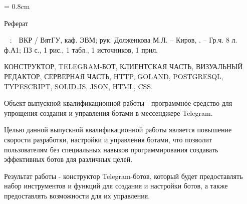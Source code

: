 
{

\topskip = 0.8cm
\begin{center}
	Реферат
\end{center}

\vspace{1em}

\authori\
\topic
:\
\mbox{\tpga}\
ВКР / ВятГУ, каф. ЭВМ; рук.
Долженкова М.Л. – Киров, \the\year. –
Гр.ч. 8 л. ф.А1;
ПЗ \pageref{lastpage} с.,
1 рис.,
1 табл.,
1 источников,
1 прил.

\vspace{1.5em}

КОНСТРУКТОР,
TELEGRAM-БОТ,
КЛИЕНТСКАЯ ЧАСТЬ,
ВИЗУАЛЬНЫЙ РЕДАКТОР,
СЕРВЕРНАЯ ЧАСТЬ,
HTTP,
GOLAND,
POSTGRESQL,
TYPESCRIPT,
SOLID.JS,
JSON,
HTML,
CSS.

\vspace{1.5em}

Объект выпускной квалификационной работы - программное средство для упрощения
создания и управления ботами в мессенджере Telegram.

Целью данной выпускной квалификационной работы является повышение
скорости разработки, настройки и управления
ботами, что позволит пользователям
без специальных навыков
программирования создавать
эффективных ботов для различных целей.

Результат работы - конструктор Telegram-ботов,
который будет предоставлять
набор инструментов и
функций для создания и настройки
ботов, а также предоставлять
возможности для их управления.

}
